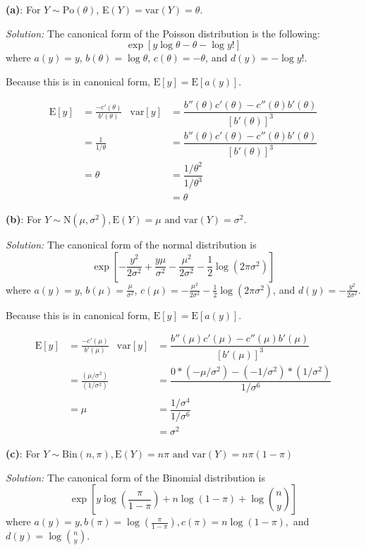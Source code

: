 \documentclass[]{article}
\begin{document}
\textbf{(a)}: For \(Y \sim \text{Po}(\theta)\),
E\((Y) = \text{var}(Y) = \theta\).

\emph{Solution: } The canonical form of the Poisson distribution is the
following: \[\exp[y\log\theta - \theta - \log y!]\] where \(a(y) = y\),
\(b(\theta) = \log\theta\), \(c(\theta) = -\theta\), and
\(d(y) = -\log y!\).

Because this is in canonical form, \(\text{E}[y] = \text{E}[a(y)]\).

\begin{align*}
\text{E}[y] &= \frac{-c'(\theta)}{b'(\theta)} & \text{var}[y] &= \dfrac{b''(\theta)c'(\theta) - c''(\theta)b'(\theta)}{[b'(\theta)]^3}\\
&= \frac{1}{1/\theta} & &= \dfrac{b''(\theta)c'(\theta) - c''(\theta)b'(\theta)}{[b'(\theta)]^3}\\
&= \theta & &= \dfrac{1/\theta^2}{1/\theta^3}\\
& & &= \theta
\end{align*}

\textbf{(b)}: For
\(Y \sim \text{N}(\mu, \sigma^2), \text{E}(Y) = \mu \text{ and var}(Y) = \sigma^2\).

\emph{Solution: } The canonical form of the normal distribution is \[
\exp\left[-\frac{y^2}{2\sigma^2} + \frac{y\mu}{\sigma^2} - \frac{\mu^2}{2\sigma^2} - \frac{1}{2}\log(2\pi\sigma^2)   \right]
\] where \(a(y) = y\), \(b(\mu) = \frac{\mu}{\sigma^2}\),
\(c(\mu) = -\frac{\mu^2}{2\sigma^2} - \frac{1}{2}\log(2\pi\sigma^2)\),
and \(d(y) = -\frac{y^2}{2\sigma^2}\).

Because this is in canonical form, \(\text{E}[y] = \text{E}[a(y)]\).

\begin{align*}
\text{E}[y] &= \frac{-c'(\mu)}{b'(\mu)} & \text{var}[y] &= \dfrac{b''(\mu)c'(\mu) - c''(\mu)b'(\mu)}{[b'(\mu)]^3}\\
&= \frac{(\mu/\sigma^2)}{(1/\sigma^2)}      & &= \dfrac{0*(-\mu/\sigma^2) - (-1/\sigma^2)*(1/\sigma^2)}{1/\sigma^6} \\
&= \mu                                      & &= \dfrac{1/\sigma^4}{1/\sigma^6}\\
& & &= \sigma^2
\end{align*}

\textbf{(c)}: For
\(Y \sim \text{Bin}(n, \pi), \text{E}(Y) = n\pi \text{ and var}(Y) = n\pi(1 - \pi)\)

\emph{Solution: } The canonical form of the Binomial distribution is \[
\exp\left[y\log\left(\frac{\pi}{1-\pi}\right) + n\log(1-\pi) + \log\binom{n}{y}\right]
\] where
\(a(y) = y, b(\pi) = \log\left(\frac{\pi}{1-\pi}\right), c(\pi) = n\log(1-\pi),\)
and \(d(y) = \log\binom{n}{y}\).
\end{document}
